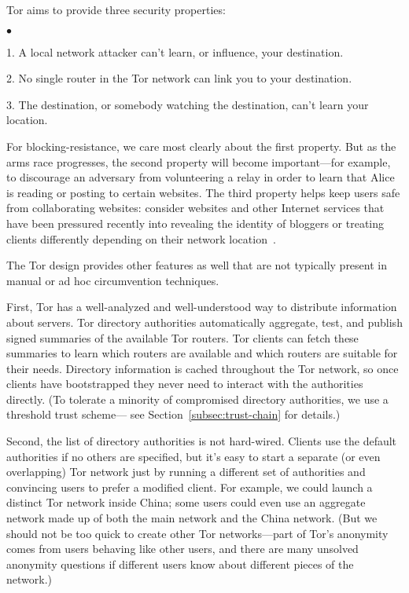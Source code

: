 \documentclass{llncs}
\newenvironment{tightlist}{\begin{list}{$\bullet$}{
  \setlength{\itemsep}{0mm}
    \setlength{\parsep}{0mm}
    }}{\end{list}}
\begin{document}
Tor aims to provide three security properties:
\begin{tightlist}
\item 1. A local network attacker can't learn, or influence, your
destination.
\item 2. No single router in the Tor network can link you to your
destination.
\item 3. The destination, or somebody watching the destination,
can't learn your location.
\end{tightlist}

For blocking-resistance, we care most clearly about the first
property. But as the arms race progresses, the second property
will become important---for example, to discourage an adversary
from volunteering a relay in order to learn that Alice is reading
or posting to certain websites. The third property helps keep users safe from
collaborating websites: consider websites and other Internet services 
that have been pressured
recently into revealing the identity of bloggers
or treating clients differently depending on their network
location~\cite{goodell-syverson06}.

The Tor design provides other features as well that are not typically
present in manual or ad hoc circumvention techniques.

First, Tor has a well-analyzed and well-understood way to distribute
information about servers.
Tor directory authorities automatically aggregate, test,
and publish signed summaries of the available Tor routers. Tor clients
can fetch these summaries to learn which routers are available and
which routers are suitable for their needs. Directory information is cached
throughout the Tor network, so once clients have bootstrapped they never
need to interact with the authorities directly. (To tolerate a minority
of compromised directory authorities, we use a threshold trust scheme---
see Section~\ref{subsec:trust-chain} for details.)

Second, the list of directory authorities is not hard-wired.
Clients use the default authorities if no others are specified,
but it's easy to start a separate (or even overlapping) Tor network just
by running a different set of authorities and convincing users to prefer
a modified client. For example, we could launch a distinct Tor network
inside China; some users could even use an aggregate network made up of
both the main network and the China network. (But we should not be too
quick to create other Tor networks---part of Tor's anonymity comes from
users behaving like other users, and there are many unsolved anonymity
questions if different users know about different pieces of the network.)
\end{document}
